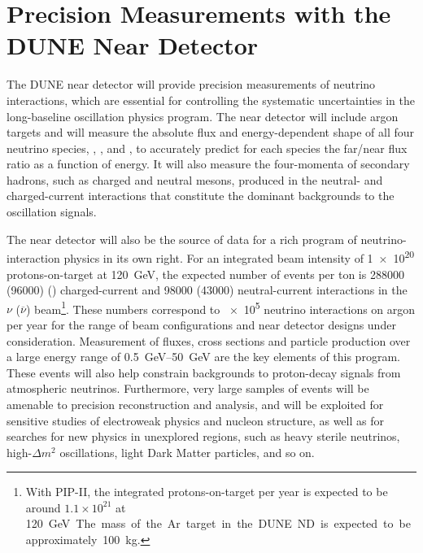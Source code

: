 %
%
\section{Precision Measurements with the DUNE Near Detector}

The DUNE near detector
will provide precision measurements of
neutrino interactions, which are essential
for controlling the systematic uncertainties in the long-baseline
oscillation physics program.  The near detector %
will include argon targets and will measure the absolute flux and energy-dependent
shape of all four neutrino species, \numu, \anumu, \nue and \anue,
to accurately predict for each species the
far/near flux ratio as a function of energy.  It will also measure the
four-momenta of secondary hadrons, such as charged and neutral mesons,
produced in the neutral- and charged-current interactions that
constitute the dominant backgrounds to the oscillation signals.

The near detector will also be the source of data for a rich program
of neutrino-interaction physics in its own right. For an integrated
beam intensity of \num{1e20} %
protons-on-target at \SI{120}{GeV}, the expected number of events per
ton is \num{288000} (\num{96000}) %
\numu (\anumu) charged-current and \num{98000} (\num{43000}) neutral-current interactions in the $\nu$ ($\overline\nu$) beam\footnote{With PIP-II, the integrated protons-on-target per year is
  expected to be around $1.1\times 10^{21}$ at \SI{120}\GeV. The mass
  of the Ar target in the DUNE ND is expected to be approximately
  100~kg.}. 
  These numbers correspond to \num{e5} neutrino interactions
on argon per year for the range of beam configurations and near detector
designs under consideration.  Measurement of fluxes, cross sections
and particle production over a large energy range of
\SIrange{0.5}{50}{\GeV} are the key elements of this program.  These
events will also help constrain backgrounds to proton-decay signals
from atmospheric neutrinos.  Furthermore, very large samples of events
will be amenable to precision reconstruction and analysis, and will be
exploited for sensitive studies of electroweak physics and nucleon
structure, as well as for searches for new physics in unexplored
regions, such as heavy sterile neutrinos, high-$\Delta m^2$
oscillations, light Dark Matter particles, and so on.

